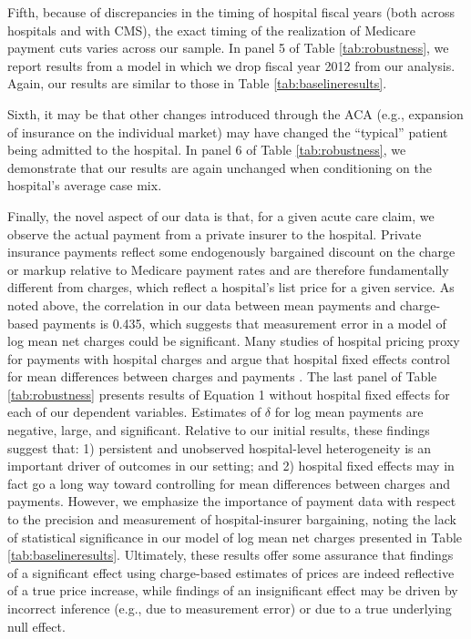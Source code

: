 \documentclass[12pt]{article}
\begin{document}
Fifth, because of discrepancies in the timing of hospital fiscal years (both across hospitals and with CMS), the exact timing of the realization of Medicare payment cuts varies across our sample. In panel 5 of Table \ref{tab:robustness}, we report results from a model in which we drop fiscal year 2012 from our analysis. Again, our results are similar to those in Table \ref{tab:baselineresults}.

Sixth, it may be that other changes introduced through the ACA (e.g., expansion of insurance on the individual market) may have changed the ``typical'' patient being admitted to the hospital. In panel 6 of Table \ref{tab:robustness}, we demonstrate that our results are again unchanged when conditioning on the hospital's average case mix.

Finally, the novel aspect of our data is that, for a given acute care claim, we observe the actual payment from a private insurer to the hospital. Private insurance payments reflect some endogenously bargained discount on the charge or markup relative to Medicare payment rates and are therefore fundamentally different from charges, which reflect a hospital's list price for a given service. As noted above, the correlation in our data between mean payments and charge-based payments is 0.435, which suggests that measurement error in a model of log mean net charges could be significant. Many studies of hospital pricing proxy for payments with hospital charges and argue that hospital fixed effects control for mean differences between charges and payments \citep{cutler2000}. The last panel of Table \ref{tab:robustness} presents results of Equation 1 without hospital fixed effects for each of our dependent variables.  Estimates of $\delta$ for log mean payments are negative, large, and significant. Relative to our initial results, these findings suggest that: 1) persistent and unobserved hospital-level heterogeneity is an important driver of outcomes in our setting; and 2) hospital fixed effects may in fact go a long way toward controlling for mean differences between charges and payments. However, we emphasize the importance of payment data with respect to the precision and measurement of hospital-insurer bargaining, noting the lack of statistical significance in our model of log mean net charges presented in Table \ref{tab:baselineresults}. Ultimately, these results offer some assurance that findings of a significant effect using charge-based estimates of prices are indeed reflective of a true price increase, while findings of an insignificant effect may be driven by incorrect inference (e.g., due to measurement error) or due to a true underlying null effect.
\end{document}
